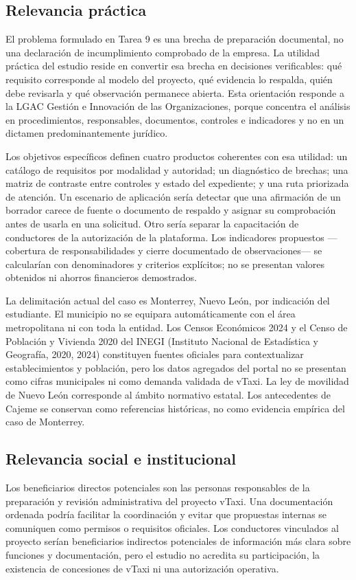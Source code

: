 {\subsection{Relevancia práctica}
El problema formulado en Tarea 9 es una brecha de preparación documental, no una declaración de incumplimiento comprobado de la empresa. La utilidad práctica del estudio reside en convertir esa brecha en decisiones verificables: qué requisito corresponde al modelo del proyecto, qué evidencia lo respalda, quién debe revisarla y qué observación permanece abierta. Esta orientación responde a la LGAC Gestión e Innovación de las Organizaciones, porque concentra el análisis en procedimientos, responsables, documentos, controles e indicadores y no en un dictamen predominantemente jurídico.


Los objetivos específicos definen cuatro productos coherentes con esa utilidad: un catálogo de requisitos por modalidad y autoridad; un diagnóstico de brechas; una matriz de contraste entre controles y estado del expediente; y una ruta priorizada de atención. Un escenario de aplicación sería detectar que una afirmación de un borrador carece de fuente o documento de respaldo y asignar su comprobación antes de usarla en una solicitud. Otro sería separar la capacitación de conductores de la autorización de la plataforma. Los indicadores propuestos —cobertura de responsabilidades y cierre documentado de observaciones— se calcularían con denominadores y criterios explícitos; no se presentan valores obtenidos ni ahorros financieros demostrados.


La delimitación actual del caso es Monterrey, Nuevo León, por indicación del estudiante. El municipio no se equipara automáticamente con el área metropolitana ni con toda la entidad. Los Censos Económicos 2024 y el Censo de Población y Vivienda 2020 del INEGI (Instituto Nacional de Estadística y Geografía, 2020, 2024) constituyen fuentes oficiales para contextualizar establecimientos y población, pero los datos agregados del portal no se presentan como cifras municipales ni como demanda validada de vTaxi. La ley de movilidad de Nuevo León corresponde al ámbito normativo estatal. Los antecedentes de Cajeme se conservan como referencias históricas, no como evidencia empírica del caso de Monterrey.


\subsection{Relevancia social e institucional}
Los beneficiarios directos potenciales son las personas responsables de la preparación y revisión administrativa del proyecto vTaxi. Una documentación ordenada podría facilitar la coordinación y evitar que propuestas internas se comuniquen como permisos o requisitos oficiales. Los conductores vinculados al proyecto serían beneficiarios indirectos potenciales de información más clara sobre funciones y documentación, pero el estudio no acredita su participación, la existencia de concesiones de vTaxi ni una autorización operativa.


}
